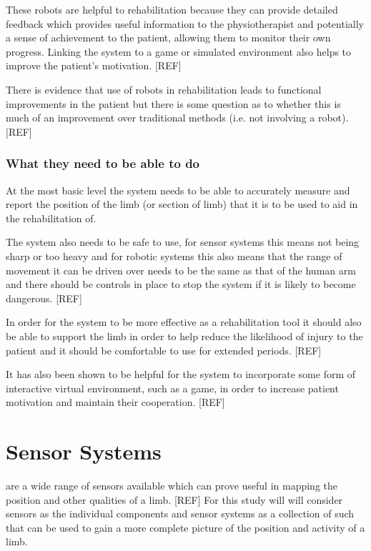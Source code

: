 \documentclass[journal]{IEEEtran}
\begin{document}
These robots are helpful to rehabilitation because they can provide detailed feedback which 
provides useful information to the physiotherapist and potentially a sense of achievement to 
the patient, allowing them to monitor their own progress. Linking the system to a game or simulated 
environment also helps to improve the patient's motivation. [REF]

There is evidence that use of robots in rehabilitation leads to functional improvements in the patient 
but there is some question as to whether this is much of an improvement over traditional methods 
(i.e. not involving a robot). [REF]

\subsubsection{What they need to be able to do}
At the most basic level the system needs to be able to accurately measure and report the 
position of the limb (or section of limb) that it is to be used to aid in the rehabilitation of.

The system also needs to be safe to use, for sensor systems this means not being sharp 
or too heavy and for robotic systems this also means that the range of movement it can be 
driven over needs to be the same as that of the human arm and there should be controls in 
place to stop the system if it is likely to become dangerous. [REF]

In order for the system to be more effective as a rehabilitation tool it should also be able to 
support the limb in order to help reduce the likelihood of injury to the patient and it should 
be comfortable to use for extended periods. [REF]

It has also been shown to be helpful for the system to incorporate some form of interactive 
virtual environment, such as a game, in order to increase patient motivation and maintain 
their cooperation. [REF]

\section{Sensor Systems}
 are a wide range of sensors available which can prove useful in 
mapping the position and other qualities of a limb. [REF]  For this study will will consider sensors 
as the individual components and sensor systems as a collection of such that can be used 
to gain a more complete picture of the position and activity of a limb.
\end{document}
